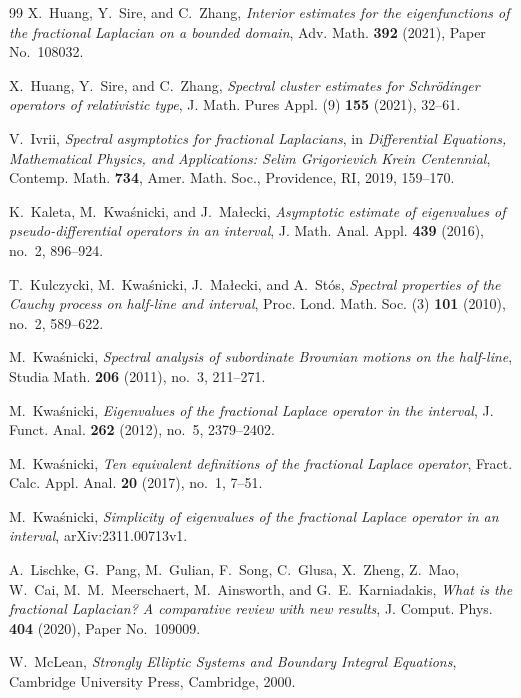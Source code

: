 \documentclass[11pt]{amsart}
\numberwithin{equation}{section}
\theoremstyle{remark}
\begin{document}
\begin{thebibliography}{99}
X.~Huang, Y.~Sire, and C.~Zhang,
\emph{Interior estimates for the eigenfunctions of the fractional Laplacian
on a bounded domain},
Adv. Math. \textbf{392} (2021), Paper No.~108032.

X.~Huang, Y.~Sire, and C.~Zhang,
\emph{Spectral cluster estimates for Schr\"odinger operators of relativistic type},
J. Math. Pures Appl. (9) \textbf{155} (2021), 32--61.

V.~Ivrii,
\emph{Spectral asymptotics for fractional Laplacians},
in \emph{Differential Equations, Mathematical Physics, and Applications:
 Selim Grigorievich Krein Centennial},
Contemp. Math. \textbf{734}, Amer. Math. Soc., Providence, RI, 2019,
159--170.

K.~Kaleta, M.~Kwa\'snicki, and J.~Ma{\l}ecki,
\emph{Asymptotic estimate of eigenvalues of pseudo-differential operators in
an interval},
J. Math. Anal. Appl. \textbf{439} (2016), no.~2, 896--924.

T.~Kulczycki, M.~Kwa\'snicki, J.~Ma{\l}ecki, and A.~St\'os,
\emph{Spectral properties of the Cauchy process on half-line and interval},
Proc. Lond. Math. Soc. (3) \textbf{101} (2010), no.~2, 589--622.

M.~Kwa\'snicki,
\emph{Spectral analysis of subordinate Brownian motions on the half-line},
Studia Math. \textbf{206} (2011), no.~3, 211--271.

M.~Kwa\'snicki,
\emph{Eigenvalues of the fractional Laplace operator in the interval},
J. Funct. Anal. \textbf{262} (2012), no.~5, 2379--2402.

M.~Kwa\'snicki,
\emph{Ten equivalent definitions of the fractional Laplace operator},
Fract. Calc. Appl. Anal. \textbf{20} (2017), no.~1, 7--51.

M.~Kwa\'snicki,
\emph{Simplicity of eigenvalues of the fractional Laplace operator in an interval},
arXiv:2311.00713v1.

A.~Lischke, G.~Pang, M.~Gulian, F.~Song, C.~Glusa, X.~Zheng, Z.~Mao,
W.~Cai, M.~M.~Meerschaert, M.~Ainsworth, and G.~E.~Karniadakis,
\emph{What is the fractional Laplacian? A comparative review with new
results},
J. Comput. Phys. \textbf{404} (2020), Paper No.~109009.

W.~McLean,
\emph{Strongly Elliptic Systems and Boundary Integral Equations},
Cambridge University Press, Cambridge, 2000.


\end{thebibliography}
\end{document}
